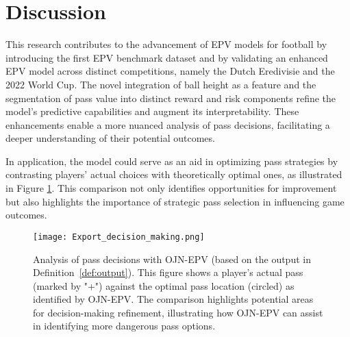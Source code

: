 \section{Discussion}

This research contributes to the advancement of EPV models for football by introducing the first EPV benchmark dataset and by validating an enhanced EPV model across distinct competitions, namely the Dutch Eredivisie and the 2022 World Cup. The novel integration of ball height as a feature and the segmentation of pass value into distinct reward and risk components refine the model's predictive capabilities and augment its interpretability. These enhancements enable a more nuanced analysis of pass decisions, facilitating a deeper understanding of their potential outcomes.

In application, the model could serve as an aid in optimizing pass strategies by contrasting players' actual choices with theoretically optimal ones, as illustrated in Figure \ref{fig:optimal_value_location}. This comparison not only identifies opportunities for improvement but also highlights the importance of strategic pass selection in influencing game outcomes. 

\begin{figure}[h]
\centering
\texttt{[image: Export\_decision\_making.png]}
\caption{Analysis of pass decisions with OJN-EPV (based on the output in Definition~\ref{def:output}). This figure shows a player's actual pass (marked by "+") against the optimal pass location (circled) as identified by OJN-EPV. The comparison highlights potential areas for decision-making refinement, illustrating how OJN-EPV can assist in identifying more dangerous pass options.}
\label{fig:optimal_value_location}
\end{figure}

\newpage

